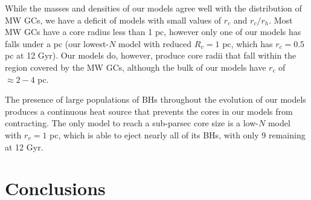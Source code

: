 \documentclass[12pt,preprint]{aastex}
\begin{document}
While the masses and densities of our models agree well with the 
distribution of MW GCs, we have a deficit of models with small values of $r_c$ and $r_c / r_h$. 
Most MW GCs have a core radius less than 1 pc, however only one of our models has falls under
a pc (our lowest-$N$ model with reduced $R_v=1$ pc, which has $r_c=0.5$ pc at 12 Gyr). 
Our models do, however, produce core radii that fall within the region covered by the MW GCs,
although the bulk of our models have $r_c$ of $\approx 2-4$ pc.

The presence of large populations of BHs throughout the evolution of our models
produces a continuous heat source that prevents the cores in our models from
contracting. The only model to reach a sub-parsec core size is a low-$N$ model with
$r_v=1$ pc, which is able to eject nearly all of its BHs, with only 9 remaining at 12 Gyr.






%
%
%
%
%



\section{Conclusions}
\end{document}
